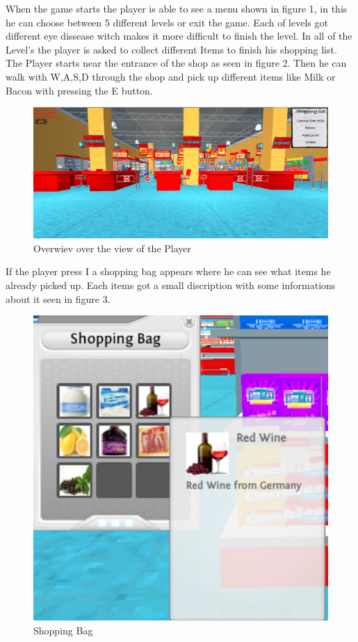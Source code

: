 \documentclass{acm_proc_article-sp}
\begin{document}
When the game starts the player is able to see a menu shown in figure 1, in this he can choose between 5 different levels or exit the game. Each of levels got different eye dissease witch makes it more difficult to finish the level. In all of the Level's the player is asked to collect different Items to finish his shopping list. The Player starts near the entrance of the shop as seen in figure 2. Then he can walk with W,A,S,D through the shop and pick up different items like Milk or Bacon with pressing the E button. 

\begin{figure}
    \centering
    \includegraphics[width=\columnwidth]{Game.png}
    \caption{Overwiev over the view of the Player}
    \label{fig:gamestart}
\end{figure}

If the player press I a shopping bag appears where he can see what items he already picked up. Each items got a small discription with some informations about it seen in figure 3. 

\begin{figure}
    \centering
    \includegraphics[width=\columnwidth]{ShoppingBag.png}
    \caption{Shopping Bag}
    \label{fig:ShoppingBag}
\end{figure}
\end{document}
